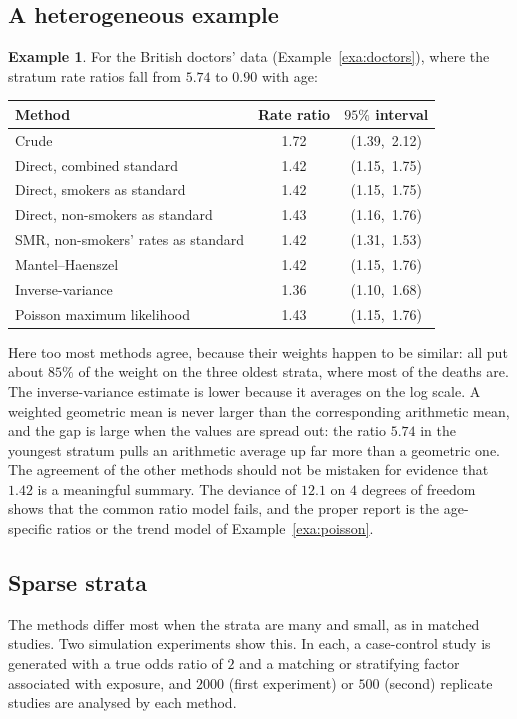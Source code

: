 \documentclass[11pt,a4paper]{article}
\numberwithin{equation}{section}
\theoremstyle{definition}
\newtheorem{exa}[thm]{Example}
\begin{document}
\subsection{A heterogeneous example}

\begin{exa}
\label{exa:cmp2}
For the British doctors' data (Example~\ref{exa:doctors}), where the stratum rate ratios fall from $5.74$ to $0.90$ with age:
\begin{center}
\begin{tabular}{lcc}
\hline
Method & Rate ratio & $95\%$ interval \\
\hline
Crude & 1.72 & (1.39,\ 2.12) \\
Direct, combined standard & 1.42 & (1.15,\ 1.75) \\
Direct, smokers as standard & 1.42 & (1.15,\ 1.75) \\
Direct, non-smokers as standard & 1.43 & (1.16,\ 1.76) \\
SMR, non-smokers' rates as standard & 1.42 & (1.31,\ 1.53) \\
Mantel--Haenszel & 1.42 & (1.15,\ 1.76) \\
Inverse-variance & 1.36 & (1.10,\ 1.68) \\
Poisson maximum likelihood & 1.43 & (1.15,\ 1.76) \\
\hline
\end{tabular}
\end{center}
Here too most methods agree, because their weights happen to be similar: all put about $85\%$ of the weight on the three oldest strata, where
most of the deaths are. The inverse-variance estimate is lower because it averages on the log scale. A weighted geometric mean is never larger than the
corresponding arithmetic mean, and the gap is large when the values are spread out: the ratio $5.74$ in the youngest stratum pulls an
arithmetic average up far more than a geometric one. The agreement of the other
methods should not be mistaken for evidence that $1.42$ is a meaningful summary. The deviance of $12.1$ on $4$ degrees of freedom shows that the
common ratio model fails, and the proper report is the age-specific ratios or the trend model of Example~\ref{exa:poisson}.
\end{exa}

\subsection{Sparse strata}

The methods differ most when the strata are many and small, as in matched studies. Two simulation experiments show this. In each, a
case-control study is generated with a true odds ratio of $2$ and a matching or stratifying factor associated with exposure, and
$2000$ (first experiment) or $500$ (second) replicate studies are analysed by each method.
\end{document}
